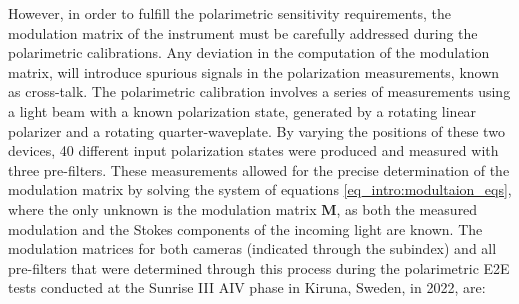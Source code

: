 However, in order to fulfill the polarimetric sensitivity requirements, the modulation matrix of the instrument must be carefully addressed during the polarimetric calibrations. Any deviation in the computation of the modulation matrix, will introduce spurious signals in the polarization measurements, known as cross-talk. The polarimetric calibration involves a series of measurements using a light beam with a known polarization state, generated by a rotating linear polarizer and a rotating quarter-waveplate. By varying the positions of these two devices, 40 different input polarization states were produced and measured with three pre-filters. These measurements allowed for the precise determination of the modulation matrix by solving the system of equations \eqref{eq_intro:modultaion_eqs}, where the only unknown is the modulation matrix $\textbf{M}$, as both the measured modulation and the Stokes components of the incoming light are known. The modulation matrices for both cameras (indicated through the subindex) and all pre-filters that were determined through this process during the polarimetric E2E tests conducted at the Sunrise III AIV phase in Kiruna, Sweden, in 2022, are:
